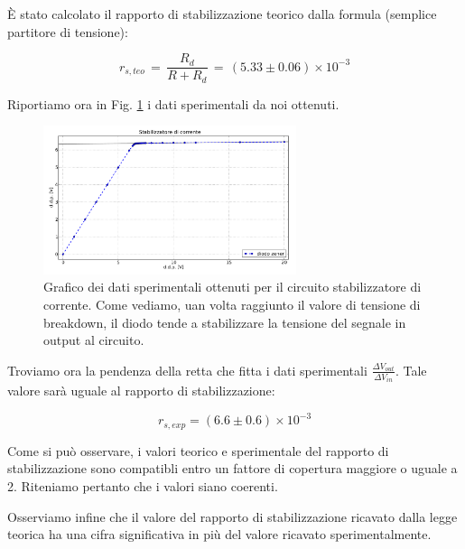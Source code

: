 È stato calcolato il rapporto di stabilizzazione teorico dalla formula (semplice partitore di tensione): 

\begin{equation}
r_{s,teo}\,=\,\frac{R_d}{R+R_d}\,=\, (5.33 \pm 0.06) \times 10^{-3}
\label{RS_teo}
\end{equation}

Riportiamo ora in Fig. \ref{fig:stabilizer} i dati sperimentali da noi ottenuti.

\begin{figure}[h]
\center
	\includegraphics[width=0.66\textwidth]{stabilizer.pdf}
	\caption{Grafico dei dati sperimentali ottenuti per il circuito stabilizzatore di corrente. Come vediamo, uan volta raggiunto il valore di tensione di breakdown, il diodo tende a stabilizzare la tensione del segnale in output al circuito.}
	\label{fig:stabilizer}
\end{figure}

Troviamo ora la pendenza della retta che fitta i dati sperimentali $\frac{\Delta V_{out}}{\Delta V_{in}}$. Tale valore sarà uguale al rapporto di stabilizzazione:

$$r_{s,exp}= (6.6 \pm 0.6) \times 10^{-3} $$

Come si può osservare, i valori teorico e sperimentale del rapporto di stabilizzazione sono compatibli entro un fattore di copertura maggiore o uguale a 2. Riteniamo pertanto che i valori siano coerenti.

Osserviamo infine che il valore del rapporto di stabilizzazione ricavato dalla legge teorica ha una cifra significativa in più del valore ricavato sperimentalmente.